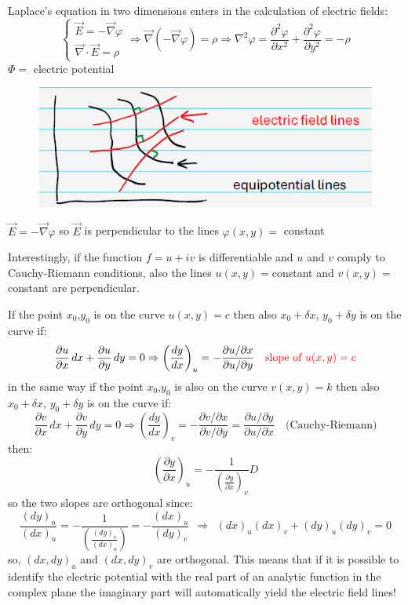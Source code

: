 \documentclass{article}
\begin{document}
\newpage
\noindent
Laplace’s equation in two dimensions enters in the calculation of electric fields:
\begin{equation}
    \begin{cases}
        \vec{E} = -\vec{\nabla} \varphi \\ 
        \vec{\nabla} \cdot \vec{E} = \rho
    \end{cases} \Rightarrow
\vec{\nabla}  (-\vec{\nabla} \varphi) = \rho
\Rightarrow
\nabla^2 \varphi = \frac{\partial^2 \varphi}{\partial x^2} + \frac{\partial^2 \varphi}{\partial y^2} = -\rho
\end{equation}
$\Phi = $ electric potential
\begin{figure}[h]
    \centering
    \includegraphics[width=0.5\linewidth]{fig12.png}
\end{figure}

\noindent
$\vec{E} = - \vec{\nabla} \varphi$ so $\vec{E}$ is perpendicular to the lines $\varphi (x,y) = $ constant

\noindent
Interestingly, if the function $f=u+iv$ is differentiable and $u$ and $v$ comply to Cauchy-Riemann conditions, also the lines $u(x,y)=$constant and $v(x,y)=$constant are perpendicular.

\noindent
If the point $x_0$,$y_0$ is on the curve $u(x,y)=c$ then also $x_0+\delta x$, $y_0+\delta y$ is on the curve if:
\begin{equation}
    \frac{\partial u}{\partial x} \, dx + \frac{\partial u}{\partial y} \, dy = 0
\Rightarrow
\left( \frac{dy}{dx} \right)_u = -\frac{\partial u / \partial x}{\partial u / \partial y} \quad \color{red}\text{slope of $u(x,y)=c$} \color{black}
\end{equation}
in the same way if the point $x_0$,$y_0$ is also on the curve $v(x,y)=k$ then also $x_0+\delta x$, $y_0+\delta y$ is on the curve if:
\begin{equation}
    \frac{\partial v}{\partial x} \, dx + \frac{\partial v}{\partial y} \, dy = 0
\Rightarrow
\left( \frac{dy}{dx} \right)_v = -\frac{\partial v / \partial x}{\partial v / \partial y}
= \frac{\partial u / \partial y}{\partial u / \partial x} \quad \text{(Cauchy-Riemann)}
\end{equation}
then:
\begin{equation}
    \left( \frac{\partial y}{\partial x} \right)_u
= -\frac{1}{\left( \frac{\partial y}{\partial x} \right)_v}D
\end{equation}
so the two slopes are orthogonal since:
\begin{equation}
    \frac{(dy)_u}{(dx)_u}
= -\frac{1}{\left( \frac{(dy)_v}{(dx)_u} \right)}
= -\frac{(dx)_u}{(dy)_v} \ \ \Rightarrow \ \ (dx)_u (dx)_v + (dy)_u (dy)_v = 0
\end{equation}
so, $(dx, dy)_u$ and $(dx, dy)_v$ are orthogonal. This means that if it is possible to identify the electric potential with the real part of an analytic function in the complex plane the imaginary part will automatically yield the electric field lines!
\end{document}
